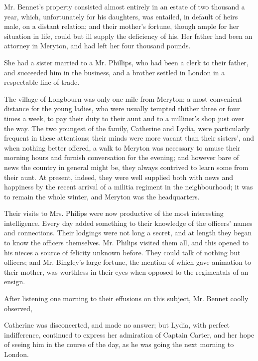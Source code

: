 Mr. Bennet's property consisted almost entirely in an estate of two thousand a year, which, unfortunately for his daughters, was entailed, in default of heirs male, on a distant relation; and their mother's fortune, though ample for her situation in life, could but ill supply the deficiency of his. Her father had been an attorney in Meryton, and had left her four thousand pounds.

She had a sister married to a Mr. Phillips, who had been a clerk to their father, and succeeded him in the business, and a brother settled in London in a respectable line of trade.

The village of Longbourn was only one mile from Meryton; a most convenient distance for the young ladies, who were usually tempted thither three or four times a week, to pay their duty to their aunt and to a milliner's shop just over the way. The two youngest of the family, Catherine and Lydia, were particularly frequent in these attentions; their minds were more vacant than their sisters', and when nothing better offered, a walk to Meryton was necessary to amuse their morning hours and furnish conversation for the evening; and however bare of news the country in general might be, they always contrived to learn some from their aunt. At present, indeed, they were well supplied both with news and happiness by the recent arrival of a militia regiment in the neighbourhood; it was to remain the whole winter, and Meryton was the headquarters.

Their visits to Mrs. Philips were now productive of the most interesting intelligence. Every day added something to their knowledge of the officers' names and connections. Their lodgings were not long a secret, and at length they began to know the officers themselves. Mr. Philips visited them all, and this opened to his nieces a source of felicity unknown before. They could talk of nothing but officers; and Mr. Bingley's large fortune, the mention of which gave animation to their mother, was worthless in their eyes when opposed to the regimentals of an ensign.

After listening one morning to their effusions on this subject, Mr. Bennet coolly observed,


Catherine was disconcerted, and made no answer; but Lydia, with perfect indifference, continued to express her admiration of Captain Carter, and her hope of seeing him in the course of the day, as he was going the next morning to London.


